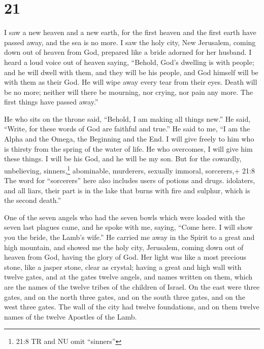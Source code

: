 \hypertarget{section-20}{%
\section{21}\label{section-20}}

 I saw a new heaven and a new earth, for the first heaven
and the first earth have passed away, and the sea is no more.
 I saw the holy city, New Jerusalem, coming down out of
heaven from God, prepared like a bride adorned for her husband.
 I heard a loud voice out of heaven saying, ``Behold, God's
dwelling is with people; and he will dwell with them, and they will be
his people, and God himself will be with them as their God. 
He will wipe away every tear from their eyes. Death will be no more;
neither will there be mourning, nor crying, nor pain any more. The first
things have passed away.''

 He who sits on the throne said, ``Behold, I am making all
things new.'' He said, ``Write, for these words of God are faithful and
true.''  He said to me, ``I am the Alpha and the Omega, the
Beginning and the End. I will give freely to him who is thirsty from the
spring of the water of life.  He who overcomes, I will give
him these things. I will be his God, and he will be my son. 
But for the cowardly, unbelieving, sinners,\footnote{21:8 TR and NU omit
  ``sinners''} abominable, murderers, sexually immoral, sorcerers,+ 21:8
The word for ``sorcerers'' here also includes users of potions and
drugs. idolaters, and all liars, their part is in the lake that burns
with fire and sulphur, which is the second death.''

 One of the seven angels who had the seven bowls which were
loaded with the seven last plagues came, and he spoke with me, saying,
``Come here. I will show you the bride, the Lamb's wife.'' 
He carried me away in the Spirit to a great and high mountain, and
showed me the holy city, Jerusalem, coming down out of heaven from God,
 having the glory of God. Her light was like a most
precious stone, like a jasper stone, clear as crystal; 
having a great and high wall with twelve gates, and at the gates twelve
angels, and names written on them, which are the names of the twelve
tribes of the children of Israel.  On the east were three
gates, and on the north three gates, and on the south three gates, and
on the west three gates.  The wall of the city had twelve
foundations, and on them twelve names of the twelve Apostles of the
Lamb.

